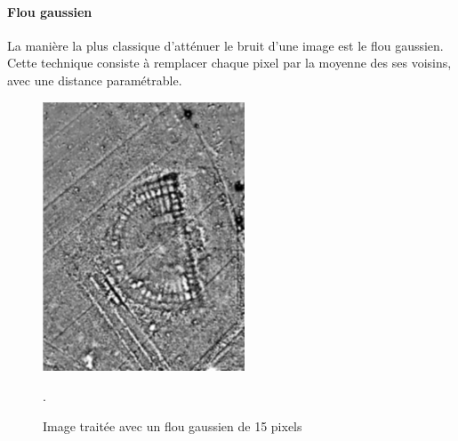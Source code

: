 \documentclass[a4paper, 12pt, titlepage, oneside, french]{article}
\begin{document}
	\paragraph{\textbf{Flou gaussien}}
	La manière la plus classique d'atténuer le bruit d'une image est le flou gaussien. Cette technique consiste à remplacer chaque pixel par la moyenne des ses voisins, avec une distance paramétrable.
	\begin{figure}[H]
		\centering
		\includegraphics[width=6cm]{filter_gaussian.png}
		\caption{Image traitée avec un flou gaussien de 15 pixels}. 
		\label{fig:FilterGaussian}
	\end{figure}

	\newpage
\end{document}
